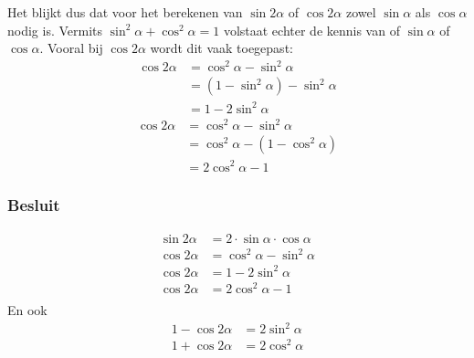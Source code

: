 \documentclass[a4paper,12pt]{article}
\begin{document}
\begin{theorie}
Het blijkt dus dat voor het berekenen van $\sin 2\alpha$ of $\cos 2\alpha$ zowel $\sin\alpha$ als $\cos\alpha$
nodig is. Vermits $\sin^2\alpha + \cos^2\alpha = 1$ volstaat echter de kennis van of $\sin\alpha$ of
$\cos\alpha$. Vooral bij $\cos 2\alpha$ wordt dit vaak toegepast:
\begin{align*}
       \cos 2\alpha &= \cos^2\alpha - \sin^2\alpha\\
                    &= (1 - \sin^2\alpha) - \sin^2\alpha\\
                    &= 1 - 2\sin^2\alpha
\end{align*}
\begin{align*}
       \cos 2\alpha &= \cos^2\alpha - \sin^2\alpha\\
                    &= \cos^2\alpha - (1 - \cos^2\alpha)\\
                    &= 2\cos^2\alpha - 1
\end{align*}

\subsubsection*{Besluit}
\begin{align*}
  \sin 2\alpha &= 2\cdot\sin\alpha\cdot\cos\alpha\\
  \cos 2\alpha &= \cos^2\alpha -\sin^2\alpha\\
  \cos 2\alpha &= 1 - 2\sin^2\alpha\\
  \cos 2\alpha &= 2\cos^2\alpha - 1\\
\end{align*}
En ook
\begin{align*}
  1 - \cos 2\alpha &= 2\sin^2\alpha\\
  1 + \cos 2\alpha &= 2\cos^2\alpha \\
\end{align*}


\end{theorie}
\end{document}

